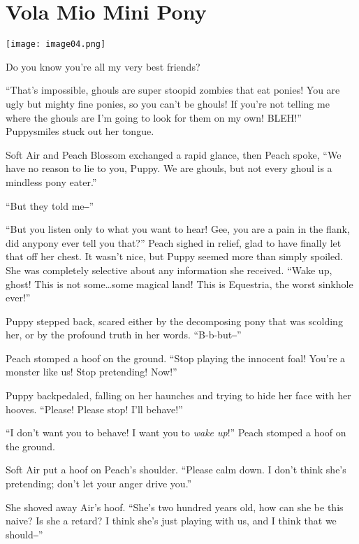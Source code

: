 
\chapter{Vola Mio Mini Pony}

\texttt{[image: image04.png]}

\begin{intro}
Do you know you're all my very best friends?
\end{intro}



``That's impossible, ghouls are super stoopid zombies that eat ponies! You are ugly but mighty fine ponies, so you can't be ghouls! If you're not telling me where the ghouls are I'm going to look for them on my own! BLEH!'' Puppysmiles stuck out her tongue.

Soft Air and Peach Blossom exchanged a rapid glance, then Peach spoke, ``We have no reason to lie to you, Puppy. We are ghouls, but not every ghoul is a mindless pony eater.''

``But they told me‒''

``But you listen only to what you want to hear! Gee, you are a pain in the flank, did anypony ever tell you that?'' Peach sighed in relief, glad to have finally let that off her chest. It wasn't nice, but Puppy seemed more than simply spoiled. She was completely selective about any information she received. ``Wake up, ghost! This is not some\dots some magical land! This is Equestria, the worst sinkhole ever!''

Puppy stepped back, scared either by the decomposing pony that was scolding her, or by the profound truth in her words. ``B-b-but‒''

Peach stomped a hoof on the ground. ``Stop playing the innocent foal! You're a monster like us! Stop pretending! Now!''

Puppy backpedaled, falling on her haunches and trying to hide her face with her hooves. ``Please! Please stop! I'll behave!''

``I don't want you to behave! I want you to \emph{wake up}\/!'' Peach stomped a hoof on the ground.

Soft Air put a hoof on Peach's shoulder. ``Please calm down. I don't think she's pretending; don't let your anger drive you.''

She shoved away Air's hoof. ``She's two hundred years old, how can she be this naive? Is she a retard? I think she's just playing with us, and I think that we should‒''

